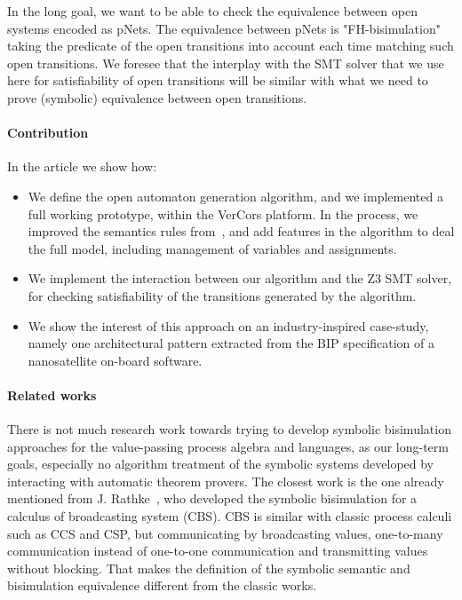 \documentclass{lncs/llncs}
\newcommand{\TODO}[1]{\textcolor{red}{\textbf{[TODO:#1]}}}
\begin{document}
In the long goal, we want to be able to check the equivalence between
open systems encoded as pNets. The equivalence between pNets is
"FH-bisimulation" taking the 
predicate of the open transitions into account each time matching such
open transitions. We foresee that the interplay with the SMT solver
that we use here for satisfiability of open transitions will be
similar with what we need to prove (symbolic) equivalence between open
transitions. 

\paragraph{Contribution}
In the article we show how:
\begin{itemize}
\item We define the open automaton generation algorithm, and we
  implemented a full working prototype, within the 
  VerCors platform. In the process, we improved the
  semantics rules from~\cite{henrio:Forte2016}, and add features in
  the algorithm to deal the full 
  model, including management of variables and assignments.
\item We implement the interaction between our algorithm and the Z3
    SMT solver, for checking satisfiability of the transitions
    generated by the algorithm.
\item We show the interest of this approach on an
    industry-inspired case-study, namely one architectural pattern
    extracted from the BIP specification of a nanosatellite on-board
    software.
\end{itemize}





\paragraph{Related works}




There is not much research work towards trying to develop symbolic bisimulation approaches
for the value-passing process algebra and languages, as our long-term goals,
especially no algorithm treatment of the symbolic systems developed by
interacting with automatic theorem provers. The closest work is the
one already mentioned from J. Rathke~\cite{HennessyRathke:TCS98},
who developed the symbolic bisimulation for a
calculus of broadcasting system (CBS). CBS is similar with classic
process calculi such as CCS and CSP, but communicating by broadcasting
values, one-to-many communication instead of one-to-one communication
and transmitting values without blocking. That makes the definition of
the symbolic semantic and bisimulation equivalence different from the
classic works.
\end{document}
